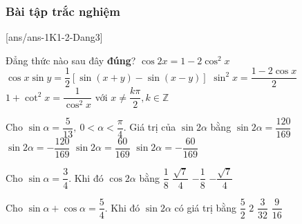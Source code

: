\subsubsection{Bài tập trắc nghiệm}
[ans/ans-1K1-2-Dang3]
\begin{ex}%
	Đẳng thức nào sau đây \textbf{đúng}?
	\choice
	{$ \cos2x=1-2\cos^2x $}
	{\True $ \cos x \sin y=\dfrac{1}{2}\left[ \sin(x+y)-\sin(x-y)\right]  $}
	{$ \sin^2x=\dfrac{1-2\cos x}{2} $}
	{$ 1+\cot^2x=\dfrac{1}{\cos^2x}$ với $x\ne\dfrac{k\pi}{2},k\in\mathbb{Z} $}
\end{ex}
\begin{ex}%
	Cho $\sin\alpha=\dfrac{5}{13},\ 0<\alpha<\dfrac{\pi}{4}$. Giá trị của $\sin2\alpha$ bằng
	\choice
	{\True $\sin2\alpha=\dfrac{120}{169}$}
	{$\sin2\alpha=-\dfrac{120}{169}$}
	{$\sin2\alpha=\dfrac{60}{169}$}
	{$\sin2\alpha=-\dfrac{60}{169}$}
\end{ex}
\begin{ex}%
	Cho $\sin\alpha =\dfrac{3}{4}$. Khi đó $\cos 2\alpha$ bằng
	\choice
	{\True $\dfrac{1}{8}$}
	{$\dfrac{\sqrt{7}}{4}$}
	{$-\dfrac{1}{8}$}
	{$-\dfrac{\sqrt{7}}{4}$}
\end{ex}

\begin{ex}%
	Cho $\sin\alpha+\cos\alpha=\dfrac{5}{4}$. Khi đó $\sin 2\alpha$ có giá trị bằng
	\choice
	{$\dfrac{5}{2}$}
	{$2$}
	{$\dfrac{3}{32}$}
	{\True $\dfrac{9}{16}$}
\end{ex}

